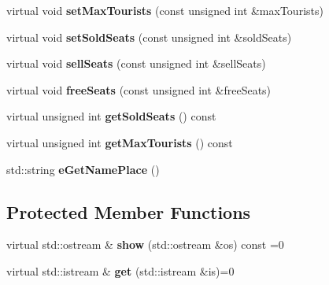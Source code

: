 \begin{DoxyCompactItemize}
\item 
\hypertarget{class_excursion_a9bb8a4ab1315a761e5e77916583395a0}{}virtual void {\bfseries set\+Max\+Tourists} (const unsigned int \&max\+Tourists)\label{class_excursion_a9bb8a4ab1315a761e5e77916583395a0}

\item 
\hypertarget{class_excursion_ad26a68806010d73090ff692d589cd6db}{}virtual void {\bfseries set\+Sold\+Seats} (const unsigned int \&sold\+Seats)\label{class_excursion_ad26a68806010d73090ff692d589cd6db}

\item 
\hypertarget{class_excursion_a637bb734067850afdb8e03387053ed1b}{}virtual void {\bfseries sell\+Seats} (const unsigned int \&sell\+Seats)\label{class_excursion_a637bb734067850afdb8e03387053ed1b}

\item 
\hypertarget{class_excursion_a745a8ad5fc4f49c138ea1f02ffd8a2bf}{}virtual void {\bfseries free\+Seats} (const unsigned int \&free\+Seats)\label{class_excursion_a745a8ad5fc4f49c138ea1f02ffd8a2bf}

\item 
\hypertarget{class_excursion_a7c7b692a96bccdaed968560c0d64ff39}{}virtual unsigned int {\bfseries get\+Sold\+Seats} () const \label{class_excursion_a7c7b692a96bccdaed968560c0d64ff39}

\item 
\hypertarget{class_excursion_a47c133a0994313c97ff30629de2c9967}{}virtual unsigned int {\bfseries get\+Max\+Tourists} () const \label{class_excursion_a47c133a0994313c97ff30629de2c9967}

\item 
\hypertarget{class_excursion_adf535a29b8de27c166ac4cf9ce6dbbe5}{}std\+::string {\bfseries e\+Get\+Name\+Place} ()\label{class_excursion_adf535a29b8de27c166ac4cf9ce6dbbe5}

\end{DoxyCompactItemize}
\subsection*{Protected Member Functions}
\begin{DoxyCompactItemize}
\item 
\hypertarget{class_excursion_a3e80eaf524f6380dffa15c309a4fe9b1}{}virtual std\+::ostream \& {\bfseries show} (std\+::ostream \&os) const =0\label{class_excursion_a3e80eaf524f6380dffa15c309a4fe9b1}

\item 
\hypertarget{class_excursion_a99997fabe3a8997ec0f9fe9c32475c9b}{}virtual std\+::istream \& {\bfseries get} (std\+::istream \&is)=0\label{class_excursion_a99997fabe3a8997ec0f9fe9c32475c9b}

\end{DoxyCompactItemize}
